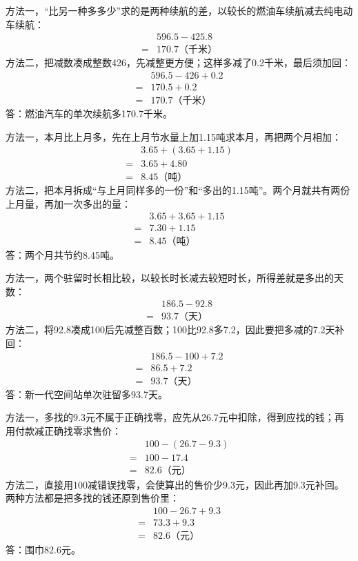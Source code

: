 \documentclass[multi=snippet,border=0pt]{standalone}
\newenvironment{snippet}[3]{\begin{minipage}{#1bp}\color{answerred}\fontsize{#2}{#3}\selectfont\raggedright}{\end{minipage}}
\begin{document}
\begin{snippet}{505}{11.5}{14}方法一，“比另一种多多少”求的是两种续航的差，以较长的燃油车续航减去纯电动车续航：\[\begin{aligned}&596.5-425.8\\={}&170.7\text{（千米）}\end{aligned}\]方法二，把减数凑成整数426，先减整更方便；这样多减了0.2千米，最后须加回：\[\begin{aligned}&596.5-426+0.2\\={}&170.5+0.2\\={}&170.7\text{（千米）}\end{aligned}\]答：燃油汽车的单次续航多170.7千米。\end{snippet}
\begin{snippet}{505}{11.5}{14}方法一，本月比上月多，先在上月节水量上加1.15吨求本月，再把两个月相加：\[\begin{aligned}&3.65+(3.65+1.15)\\={}&3.65+4.80\\={}&8.45\text{（吨）}\end{aligned}\]方法二，把本月拆成“与上月同样多的一份”和“多出的1.15吨”。两个月就共有两份上月量，再加一次多出的量：\[\begin{aligned}&3.65+3.65+1.15\\={}&7.30+1.15\\={}&8.45\text{（吨）}\end{aligned}\]答：两个月共节约8.45吨。\end{snippet}
\begin{snippet}{505}{11.5}{14}方法一，两个驻留时长相比较，以较长时长减去较短时长，所得差就是多出的天数：\[\begin{aligned}&186.5-92.8\\={}&93.7\text{（天）}\end{aligned}\]方法二，将92.8凑成100后先减整百数；100比92.8多7.2，因此要把多减的7.2天补回：\[\begin{aligned}&186.5-100+7.2\\={}&86.5+7.2\\={}&93.7\text{（天）}\end{aligned}\]答：新一代空间站单次驻留多93.7天。\end{snippet}
\begin{snippet}{505}{11.5}{14}方法一，多找的9.3元不属于正确找零，应先从26.7元中扣除，得到应找的钱；再用付款减正确找零求售价：\[\begin{aligned}&100-(26.7-9.3)\\={}&100-17.4\\={}&82.6\text{（元）}\end{aligned}\]方法二，直接用100减错误找零，会使算出的售价少9.3元，因此再加9.3元补回。两种方法都是把多找的钱还原到售价里：\[\begin{aligned}&100-26.7+9.3\\={}&73.3+9.3\\={}&82.6\text{（元）}\end{aligned}\]答：围巾82.6元。\end{snippet}
\end{document}
